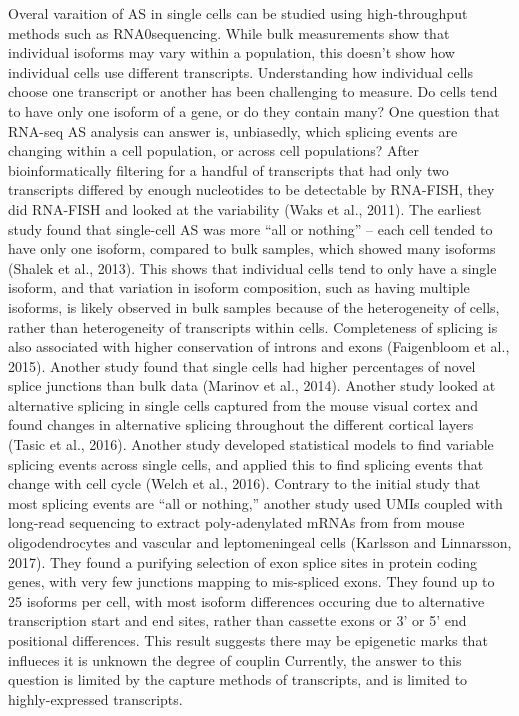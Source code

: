 Overal varaition of AS in single cells can be studied using high-throughput methods such as RNA0sequencing. While bulk measurements show that individual isoforms may vary within a population, this doesn’t show how individual cells use different transcripts. Understanding how individual cells choose one transcript or another has been challenging to measure. Do cells tend to have only one isoform of a gene, or do they contain many? One question that RNA-seq AS analysis can answer is, unbiasedly, which splicing events are changing within a cell population, or across cell populations? After bioinformatically filtering for a handful of transcripts that had only two transcripts differed by enough nucleotides to be detectable by RNA-FISH, they did RNA-FISH and looked at the variability (Waks et al., 2011). The earliest study found that single-cell AS was more “all or nothing” -- each cell tended to have only one isoform, compared to bulk samples, which showed many isoforms (Shalek et al., 2013). This shows that individual cells tend to only have a single isoform, and that variation in isoform composition, such as having multiple isoforms, is likely observed in bulk samples because of the heterogeneity of cells, rather than heterogeneity of transcripts within cells. Completeness of splicing is also associated with higher conservation of introns and exons (Faigenbloom et al., 2015). Another study found that single cells had higher percentages of novel splice junctions than bulk data (Marinov et al., 2014). Another study looked at alternative splicing in single cells captured from the mouse visual cortex and found changes in alternative splicing throughout the different cortical layers (Tasic et al., 2016). Another study developed statistical models to find variable splicing events across single cells, and applied this to find splicing events that change with cell cycle (Welch et al., 2016). Contrary to the initial study that most splicing events are “all or nothing,” another study used UMIs coupled with long-read sequencing to extract poly-adenylated mRNAs from from mouse oligodendrocytes and vascular and leptomeningeal cells  (Karlsson and Linnarsson, 2017). They found a purifying selection of exon splice sites in protein coding genes, with very few junctions mapping to mis-spliced exons. They found up to 25 isoforms per cell, with most isoform differences occuring due to alternative transcription start and end sites, rather than cassette exons or 3’ or 5’ end positional differences. This result suggests there may be epigenetic marks that influeces it is unknown the degree of couplin Currently, the answer to this question is limited by the capture methods of transcripts, and is limited to highly-expressed transcripts.
